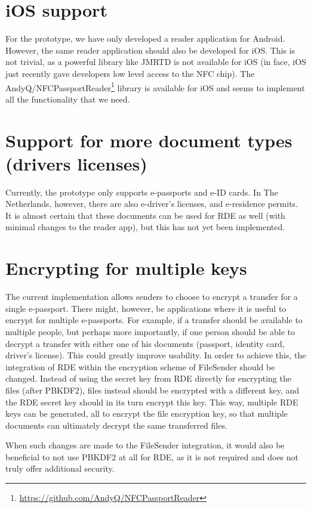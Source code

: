 \section{iOS support}
\label{sec:ios-support}
For the prototype, we have only developed a reader application for Android.
However, the same reader application should also be developed for iOS.
This is not trivial, as a powerful library like JMRTD is not available for iOS (in face, iOS just recently gave developers low level access to the NFC chip).
The \textsf{AndyQ/NFCPassportReader}\footnote{\url{https://github.com/AndyQ/NFCPassportReader}} library is available for iOS and seems to implement all the functionality that we need.

\section{Support for more document types (drivers licenses)}
\label{sec:support-for-more-document-types}
Currently, the prototype only supports e-passports and e-ID cards.
In The Netherlands, however, there are also e-driver's licenses, and e-residence permits.
It is almost certain that these documents can be used for RDE as well (with minimal changes to the reader app), but this has not yet been implemented.

\section{Encrypting for multiple keys}
\label{sec:encrypting-for-multiple-keys}
The current implementation allows senders to choose to encrypt a transfer for a single e-passport.
There might, however, be applications where it is useful to encrypt for multiple e-passports.
For example, if a transfer should be available to multiple people, but perhaps more importantly, if one person should be able to decrypt a transfer with either one of his documents (passport, identity card, driver's license).
This could greatly improve usability.
In order to achieve this, the integration of RDE within the encryption scheme of FileSender should be changed.
Instead of using the secret key from RDE directly for encrypting the files (after PBKDF2), files instead should be encrypted with a different key, and the RDE secret key should in its turn encrypt this key.
This way, multiple RDE keys can be generated, all to encrypt the file encryption key, so that multiple documents can ultimately decrypt the same transferred files.

When such changes are made to the FileSender integration, it would also be beneficial to not use PBKDF2 at all for RDE, as it is not required and does not truly offer additional security.

